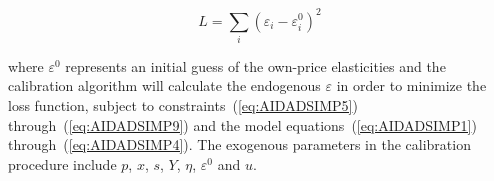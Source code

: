 \[L = \sum\limits_i {{{\left( {{\varepsilon _i} - \varepsilon _i^0} \right)}^2}} \]

\noindent where $\varepsilon^0$ represents an initial guess of the own-price elasticities and the
calibration algorithm will calculate the endogenous $\varepsilon$ in order to minimize the loss
function, subject to constraints~(\ref{eq:AIDADSIMP5}) through~(\ref{eq:AIDADSIMP9}) and the model
equations~(\ref{eq:AIDADSIMP1}) through~(\ref{eq:AIDADSIMP4}). The exogenous parameters in the
calibration procedure include $p$, $x$, $s$, $Y$, $\eta$, $\varepsilon^0$ and $u$.
